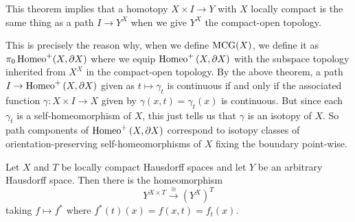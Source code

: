 \begin{note}
    This theorem implies that
    a homotopy $X \times I \to Y$ with $X$ locally
    compact is the same thing as a path
    $I \to Y^{X}$ when we give
    $Y^{X}$ the compact-open topology.
\end{note}

\begin{note}
    This is precisely the reason why, when we define
    ${\mathrm{MCG}} (X)$, we define it as
    $\pi_0 \operatorname{Homeo}^{+}(X, \partial X)$ where we equip
    $\operatorname{Homeo}^{+}\left( X, \partial X \right) $ with the
    subspace topology inherited from
    $X^{X}$ in the compact-open topology.
    By the above theorem, a path 
    $I \to \operatorname{Homeo}^{+} \left( X, \partial X \right) $ 
    given as $t \mapsto \gamma_t$
    is continuous if and only if
    the associated function
    $\gamma \colon X \times I \to X$ given
    by $\gamma(x,t) = \gamma_t(x)$ is
    continuous. But since each
    $\gamma_t$ is a self-homeomorphism of $X$, this
    just tells us that $\gamma$ is an isotopy of
    $X$. So path components
    of $\operatorname{Homeo}^{+} \left( X , \partial X \right) $ 
    correspond to isotopy classes of orientation-preserving
    self-homeomorphisms of $X$ fixing the boundary point-wise.
\end{note}

\begin{theorem}
    Let $X$ and $T$ be locally compact Hausdorff spaces
    and let $Y$ be an arbitrary Hausdorff space. Then
    there is the homeomorphism
    \[
    Y^{X \times T} \stackrel{\cong}{\to} \left( Y^{X} \right)^{T}
    \] 
    taking $f \mapsto f^{*}$ where
    $f^{*}(t) (x) = f(x,t) = f_t(x)$.
\end{theorem}

